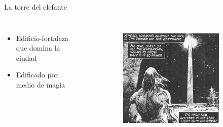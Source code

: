 \begin{frame}{La torre del elefante}
\begin{columns}
\begin{itemize}
 \item Edificio-fortaleza que domina la ciudad
 \item Edificado por medio de magia
\end{itemize}
\begin{figure}[htp]
 \centering
 \begin{subfigure}[b]{0.5\textwidth}
   \includegraphics[width=\textwidth]{img/torre/TSSC}
 \end{subfigure}
~
 \begin{subfigure}[b]{0.08\textwidth}

\end{subfigure}
\end{figure}
\end{columns}
\end{frame}
